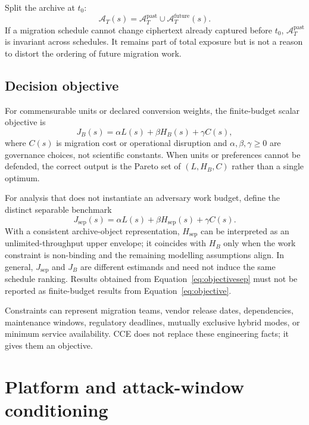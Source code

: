 \documentclass[10pt]{article}
\begin{document}
Split the archive at $t_0$:
\begin{equation}
\mathcal A_T(s)=\mathcal A_T^{\mathrm{past}}\cup\mathcal A_T^{\mathrm{future}}(s).
\end{equation}
If a migration schedule cannot change ciphertext already captured before $t_0$, $\mathcal A_T^{\mathrm{past}}$ is invariant across schedules. It remains part of total exposure but is not a reason to distort the ordering of future migration work.

\subsection{Decision objective}

For commensurable units or declared conversion weights, the finite-budget scalar objective is
\begin{equation}
J_B(s)=\alpha L(s)+\beta H_B(s)+\gamma C(s),
\label{eq:objective}
\end{equation}
where $C(s)$ is migration cost or operational disruption and $\alpha,\beta,\gamma\ge0$ are governance choices, not scientific constants. When units or preferences cannot be defended, the correct output is the Pareto set of $(L,H_B,C)$ rather than a single optimum.

For analysis that does not instantiate an adversary work budget, define the distinct separable benchmark
\begin{equation}
J_{\mathrm{sep}}(s)=\alpha L(s)+\beta H_{\mathrm{sep}}(s)+\gamma C(s).
\label{eq:objectivesep}
\end{equation}
With a consistent archive-object representation, $H_{\mathrm{sep}}$ can be interpreted as an unlimited-throughput upper envelope; it coincides with $H_B$ only when the work constraint is non-binding and the remaining modelling assumptions align. In general, $J_{\mathrm{sep}}$ and $J_B$ are different estimands and need not induce the same schedule ranking. Results obtained from Equation~\eqref{eq:objectivesep} must not be reported as finite-budget results from Equation~\eqref{eq:objective}.

Constraints can represent migration teams, vendor release dates, dependencies, maintenance windows, regulatory deadlines, mutually exclusive hybrid modes, or minimum service availability. CCE does not replace these engineering facts; it gives them an objective.

\section{Platform and attack-window conditioning}
\end{document}
